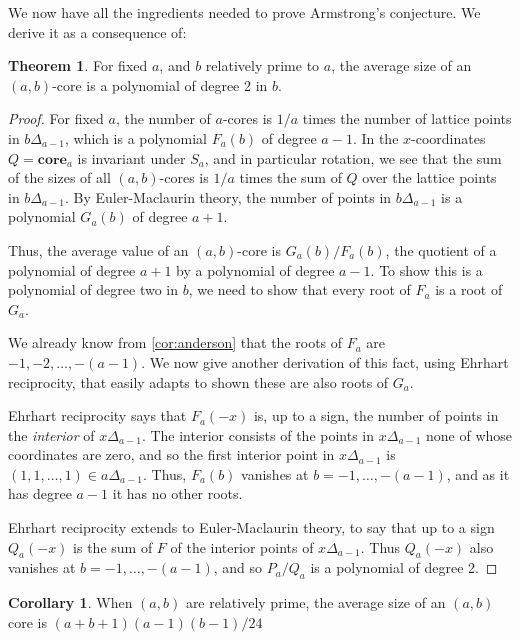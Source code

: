 \documentclass{amsart}[12pt]
\theoremstyle{definition}
\newtheorem{theorem}[dummy]{Theorem}
\newtheorem{corollary}[dummy]{Corollary}
\newcommand{\core}{\mathbf{core}}
\begin{document}
We now have all the ingredients needed to prove Armstrong's conjecture.  We derive it as a consequence of:

\begin{theorem} \label{thm:polynomial}
For fixed $a$, and $b$ relatively prime to $a$,  the average size of an $(a,b)$-core is a polynomial of degree 2 in $b$.
\end{theorem}

\begin{proof}
For fixed $a$, the number of $a$-cores is $1/a$ times the
number of lattice points in $b\Delta_{a-1}$, which is a polynomial
$F_a(b)$ of degree $a-1$.  In the $x$-coordinates $Q=\core_a$
is invariant under $S_a$, and in particular rotation, we see that the sum of the sizes of all $(a,b)$-cores is $1/a$ times the sum of $Q$ over the lattice points in $b\Delta_{a-1}$.   By Euler-Maclaurin theory, the number of points in $b\Delta_{a-1}$ is a polynomial $G_a(b)$ of degree $a+1$.

Thus, the average value of an $(a,b)$-core is $G_a(b)/F_a(b)$, the quotient of a polynomial of degree $a+1$ by a polynomial of degree $a-1$.  To show this is a polynomial of degree two in $b$, we need to show that every root of $F_a$ is a root of $G_a$.

We already know from \ref{cor:anderson} that the roots of $F_a$ are $-1,
-2,\dots, -(a-1)$.  We now give another derivation of this fact, using Ehrhart reciprocity, that easily adapts to shown these are also roots of $G_a$. 

Ehrhart reciprocity says that $F_a(-x)$ is, up to a sign, the number of
points in the \emph{interior} of $x\Delta_{a-1}$.  The interior
consists of the points in $x\Delta_{a-1}$ none of whose coordinates
are zero, and so the first interior point in $x\Delta_{a-1}$ is  $(1,1,\dots,1)\in a\Delta_{a-1}$.   Thus, $F_a(b)$ vanishes at $b=-1,\dots, -(a-1)$, and as it has degree $a-1$ it has no other roots.

Ehrhart reciprocity extends to Euler-Maclaurin theory, to say that up to a sign $Q_a(-x)$ is the sum of $F$ of the interior points of
$x\Delta_{a-1}$. Thus $Q_a(-x)$ also vanishes at
$b=-1,\dots,-(a-1)$, and so $P_a/Q_a$ is a polynomial of degree 2.

\end{proof}


\begin{corollary} \label{cor:averagesize}
When $(a,b)$ are relatively prime, the average size of an $(a,b)$ core is $(a+b+1)(a-1)(b-1)/24$
\end{corollary}
\end{document}
